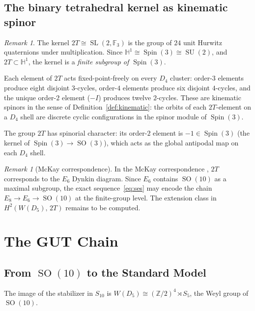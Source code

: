 \documentclass[11pt,reqno]{amsart}
\theoremstyle{plain}
\theoremstyle{definition}
\theoremstyle{remark}
\newtheorem{remark}[theorem]{Remark}
\newcommand{\Z}{\mathbb{Z}}
\newcommand{\HH}{\mathbb{H}}
\newcommand{\F}{\mathbb{F}}
\DeclareMathOperator{\Spin}{Spin}
\DeclareMathOperator{\SO}{SO}
\DeclareMathOperator{\SU}{SU}
\DeclareMathOperator{\SL}{SL}
\begin{document}
\subsection{The binary tetrahedral kernel as kinematic spinor}

\begin{remark}\label{rem:2Tspinor}
The kernel $2T \cong \SL(2,\F_3)$ is the group of $24$ unit
Hurwitz quaternions under multiplication.
Since $\HH^1 \cong \Spin(3) \cong \SU(2)$,
and $2T \subset \HH^1$,
the kernel is a \emph{finite subgroup of $\Spin(3)$}.

Each element of $2T$ acts fixed-point-freely on every $D_4$
cluster:
order-$3$ elements produce eight disjoint $3$-cycles,
order-$4$ elements produce six disjoint $4$-cycles,
and the unique order-$2$ element ($-I$) produces twelve
$2$-cycles.
These are kinematic spinors in the sense of
Definition~\ref{def:kinematic}: the orbits of each
$2T$-element on a $D_4$ shell are discrete cyclic
configurations in the spinor module of $\Spin(3)$.

The group $2T$ has spinorial character: its order-$2$ element
is $-1 \in \Spin(3)$ (the kernel of
$\Spin(3) \to \SO(3)$), which acts as the global antipodal
map on each $D_4$ shell.
\end{remark}

\begin{remark}[McKay correspondence]\label{rem:mckay}
In the McKay correspondence \cite{McKay1980}, $2T$
corresponds to the $E_6$ Dynkin diagram.
Since $E_6$ contains $\SO(10)$ as a maximal subgroup,
the exact sequence~\eqref{eq:ses} may encode the chain
$E_8 \to E_6 \to \SO(10)$ at the finite-group level.
The extension class in $H^2(W(D_5),\, 2T)$ remains to be
computed.
\end{remark}


\section{The GUT Chain}
\label{sec:gut}

\subsection{From $\SO(10)$ to the Standard Model}

The image of the stabilizer in $S_{10}$ is
$W(D_5) \cong (\Z/2)^4 \rtimes S_5$,
the Weyl group of $\SO(10)$.
\end{document}
